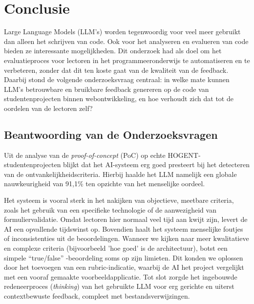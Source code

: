 
\chapter{Conclusie}%
\label{ch:conclusie}

Large Language Models (LLM's) worden tegenwoordig voor veel meer gebruikt dan alleen het schrijven van code. Ook voor het analyseren en evalueren van code bieden ze interessante mogelijkheden. Dit onderzoek had als doel om het evaluatieproces voor lectoren in het programmeeronderwijs te automatiseren en te verbeteren, zonder dat dit ten koste gaat van de kwaliteit van de feedback. Daarbij stond de volgende onderzoeksvraag centraal: in welke mate kunnen LLM's betrouwbare en bruikbare feedback genereren op de code van studentenprojecten binnen webontwikkeling, en hoe verhoudt zich dat tot de oordelen van de lectoren zelf?

\section{Beantwoording van de Onderzoeksvragen}

Uit de analyse van de \textit{proof-of-concept} (PoC) op echte HOGENT-studentenprojecten blijkt dat het AI-systeem erg goed presteert bij het detecteren van de ontvankelijkheidscriteria. Hierbij haalde het LLM namelijk een globale nauwkeurigheid van 91,1\% ten opzichte van het menselijke oordeel. 

\vspace{1em}

Het systeem is vooral sterk in het nakijken van objectieve, meetbare criteria, zoals het gebruik van een specifieke technologie of de aanwezigheid van formuliervalidatie. Omdat lectoren hier normaal veel tijd aan kwijt zijn, levert de AI een opvallende tijdswinst op. Bovendien haalt het systeem menselijke foutjes of inconsistenties uit de beoordelingen.
Wanneer we kijken naar meer kwalitatieve en complexe criteria (bijvoorbeeld 'hoe goed' is de architectuur), botst een simpele ``true/false'' -beoordeling soms op zijn limieten. Dit konden we oplossen door het toevoegen van een rubric-indicatie, waarbij de AI het project vergelijkt met een vooraf gemaakte voorbeeldapplicatie. Tot slot zorgde het ingebouwde redeneerproces (\textit{thinking}) van het gebruikte LLM voor erg gerichte en uiterst contextbewuste feedback, compleet met bestandsverwijzingen.

